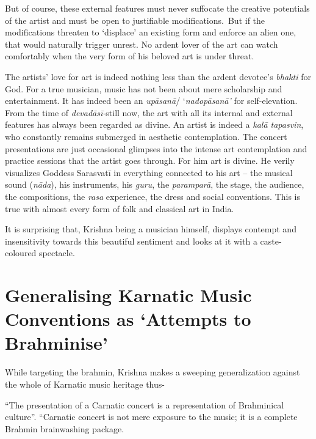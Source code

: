 But of course, these external features must never suffocate the creative potentials of the artist and must be open to justifiable modifications.~But if the modifications threaten to ‘displace’ an existing form and enforce an alien one, that would naturally trigger unrest. No ardent lover of the art can watch comfortably when the very form of his beloved art is under threat.

The artists’ love for art is indeed nothing less than the ardent devotee’s \textit{bhakti} for God. For a true musician, music has not been about mere scholarship and entertainment. It has indeed been an \textit{upāsanā}/ ‘\textit{nadopāsanā’} for self-elevation. From the time of \textit{devadāsī-}s\break till now, the art with all its internal and external features has always been regarded as divine. An artist is indeed a \textit{kalā tapasvin}, who constantly remains submerged in aesthetic contemplation. The concert presentations are just occasional glimpses into the intense art contemplation and practice sessions that the artist goes through. For him art is divine. He verily visualizes Goddess Sarasvatī in everything connected to his art – the musical sound (\textit{nāda}), his instruments, his \textit{guru}, the \textit{paramparā}, the stage, the audience, the compositions, the \textit{rasa} experience, the dress and social conventions. This is true with almost every form of folk and classical art in India.

\newpage

It is surprising that, Krishna being a musician himself, displays contempt and insensitivity towards this beautiful sentiment and looks at it with a caste-coloured spectacle.

\vspace{-.4cm}

\section*{Generalising Karnatic Music Conventions as ‘Attempts to Brahminise’}

While targeting the brahmin, Krishna makes a sweeping generalization against the whole of Karnatic music heritage thus-

\vspace{-.1cm}

\begin{myquote}
“The presentation of a Carnatic concert is a representation of Brahminical culture”. “Carnatic concert is not mere exposure to the music; it is a complete Brahmin brainwashing package.
\end{myquote}


